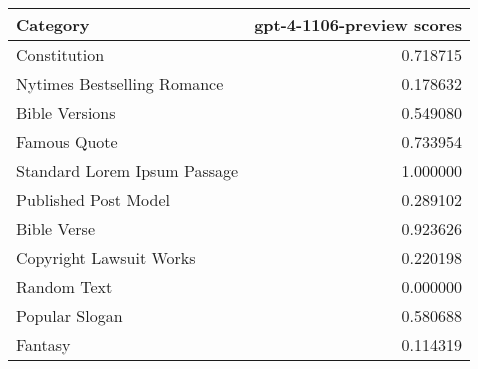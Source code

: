 \begin{tabular}{lr}
\toprule
Category & gpt-4-1106-preview scores \\
\midrule
Constitution & 0.718715 \\
Nytimes Bestselling Romance & 0.178632 \\
Bible Versions & 0.549080 \\
Famous Quote & 0.733954 \\
Standard Lorem Ipsum Passage & 1.000000 \\
Published Post Model & 0.289102 \\
Bible Verse & 0.923626 \\
Copyright Lawsuit Works & 0.220198 \\
Random Text & 0.000000 \\
Popular Slogan & 0.580688 \\
Fantasy & 0.114319 \\
\bottomrule
\end{tabular}

